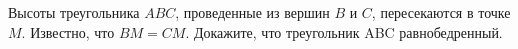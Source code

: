 \begin{ex}
	\begin{condition}
		 Высоты треугольника \( ABC \), проведенные из вершин \( B \) и \( C \), пересекаются в точке \( M \). Известно, что \( BM = CM \). Докажите, что треугольник ABC равнобедренный.
	\end{condition}
\end{ex}